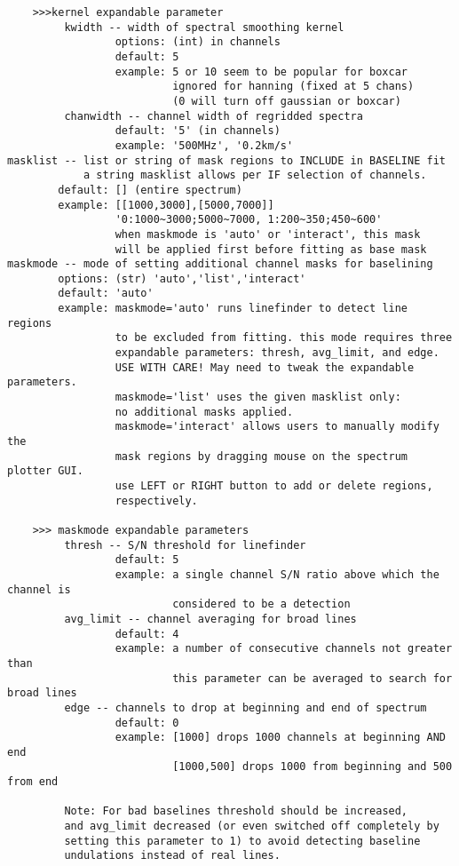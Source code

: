 \begin{verbatim}
    >>>kernel expandable parameter
         kwidth -- width of spectral smoothing kernel
                 options: (int) in channels
                 default: 5
                 example: 5 or 10 seem to be popular for boxcar
                          ignored for hanning (fixed at 5 chans)
                          (0 will turn off gaussian or boxcar)
         chanwidth -- channel width of regridded spectra
                 default: '5' (in channels)
                 example: '500MHz', '0.2km/s'
masklist -- list or string of mask regions to INCLUDE in BASELINE fit
            a string masklist allows per IF selection of channels.
        default: [] (entire spectrum)
        example: [[1000,3000],[5000,7000]]
                 '0:1000~3000;5000~7000, 1:200~350;450~600'
                 when maskmode is 'auto' or 'interact', this mask 
                 will be applied first before fitting as base mask
maskmode -- mode of setting additional channel masks for baselining
        options: (str) 'auto','list','interact'
        default: 'auto'
        example: maskmode='auto' runs linefinder to detect line regions 
                 to be excluded from fitting. this mode requires three 
                 expandable parameters: thresh, avg_limit, and edge.
                 USE WITH CARE! May need to tweak the expandable parameters.
                 maskmode='list' uses the given masklist only: 
                 no additional masks applied.
                 maskmode='interact' allows users to manually modify the 
                 mask regions by dragging mouse on the spectrum plotter GUI.
                 use LEFT or RIGHT button to add or delete regions, 
                 respectively.

    >>> maskmode expandable parameters
         thresh -- S/N threshold for linefinder
                 default: 5
                 example: a single channel S/N ratio above which the channel is
                          considered to be a detection
         avg_limit -- channel averaging for broad lines
                 default: 4
                 example: a number of consecutive channels not greater than
                          this parameter can be averaged to search for broad lines
         edge -- channels to drop at beginning and end of spectrum
                 default: 0
                 example: [1000] drops 1000 channels at beginning AND end
                          [1000,500] drops 1000 from beginning and 500 from end

         Note: For bad baselines threshold should be increased,
         and avg_limit decreased (or even switched off completely by
         setting this parameter to 1) to avoid detecting baseline
         undulations instead of real lines.


\end{verbatim}
